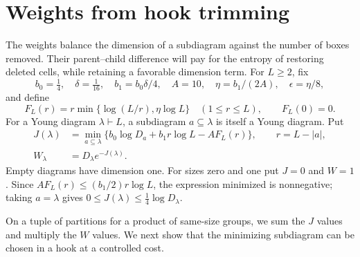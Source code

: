 \section{Weights from hook trimming}
\label{ten:weighted:part:60}
The weights balance the dimension of a subdiagram against the number of boxes removed. Their parent--child difference will pay for the entropy of restoring deleted cells, while retaining a favorable dimension term. For $L\ge2$, fix
\[
 b_0=\tfrac14,\quad\delta=\tfrac1{16},\quad
 b_1=b_0\delta/4,\quad A=10,\quad
 \eta=b_1/(2A),\quad\epsilon=\eta/8,
\]
and define
\[
 F_L(r)=r\min\{\log(L/r),\eta\log L\}\quad(1\le r\le L),
 \qquad F_L(0)=0.
\]
For a Young diagram $\lambda\vdash L$, a subdiagram $a\subseteq\lambda$ is itself a Young diagram. Put
\begin{equation}\label{ten:weighted:eq:4}
 \begin{split}
 J(\lambda)&=\min_{a\subseteq\lambda}
 \{b_0\log D_a+b_1r\log L-AF_L(r)\},\qquad r=L-|a|,\\
 W_\lambda&=D_\lambda e^{-J(\lambda)}.
 \end{split}
\end{equation}
Empty diagrams have dimension one. For sizes zero and one put $J=0$ and $W=1$. Since $AF_L(r)\le(b_1/2)r\log L$, the expression minimized is nonnegative; taking $a=\lambda$ gives
$0\le J(\lambda)\le\frac14\log D_\lambda$.

On a tuple of partitions for a product of same-size groups, we sum the $J$ values and multiply the $W$ values. We next show that the minimizing subdiagram can be chosen in a hook at a controlled cost.

